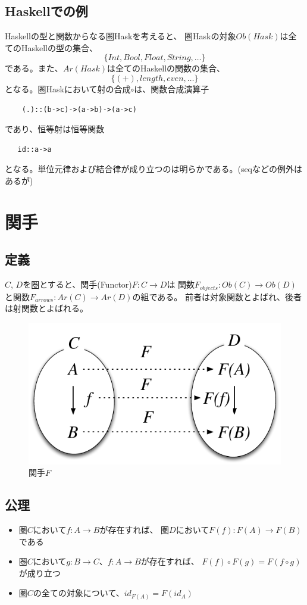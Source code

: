 \documentclass{jsarticle}
\begin{document}
\subsection{Haskellでの例}
Haskellの型と関数からなる圏Haskを考えると、
圏Haskの対象$Ob(Hask)$は全てのHaskellの型の集合、
\[\{Int, Bool, Float, String, \ldots\}\]
である。また、$Ar(Hask)$は全てのHaskellの関数の集合、
\[\{(+), length, even, \ldots\}\]
となる。圏Haskにおいて射の合成$\circ$は、関数合成演算子
\begin{lstlisting}
    (.)::(b->c)->(a->b)->(a->c)
\end{lstlisting}
であり、恒等射は恒等関数
\begin{lstlisting}
   id::a->a
\end{lstlisting}
となる。単位元律および結合律が成り立つのは明らかである。(seqなどの例外はあるが)

\newpage
\section{関手}

\subsection{定義}
$C$, $D$を圏とすると、関手(Functor)$F:C \to D$は
関数$F_{objects}:Ob(C) \to Ob(D)$と関数$F_{arrows}:Ar(C)\to Ar(D)$の組である。
前者は対象関数とよばれ、後者は射関数とよばれる。

\begin{figure}[htbp]
    \centering
    \includegraphics{diag_functor.pdf}
    \caption{関手$F$}
\end{figure}

\subsection{公理}
\begin{itemize}
    \item 圏$C$において$f:A\to B$が存在すれば、
        圏$D$において$F(f):F(A)\to F(B)$である
    \item 圏$C$において$g:B\to C$、$f:A\to B$が存在すれば、
        $F(f)\circ F(g)=F(f\circ g)$が成り立つ
    \item 圏$C$の全ての対象について、$id_{F(A)}=F(id_A)$
\end{itemize}
\end{document}
